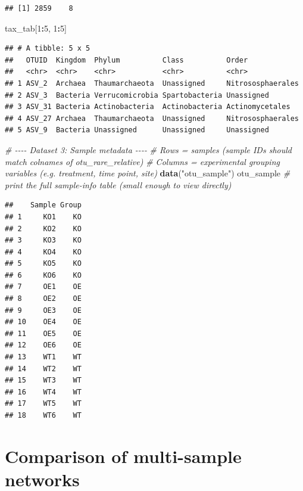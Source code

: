 \documentclass[
]{book}
\newenvironment{Shaded}{\begin{snugshade}}{\end{snugshade}}
\newcommand{\CommentTok}[1]{\textcolor[rgb]{0.56,0.35,0.01}{\textit{#1}}}
\newcommand{\DecValTok}[1]{\textcolor[rgb]{0.00,0.00,0.81}{#1}}
\newcommand{\FunctionTok}[1]{\textcolor[rgb]{0.13,0.29,0.53}{\textbf{#1}}}
\newcommand{\NormalTok}[1]{#1}
\newcommand{\SpecialCharTok}[1]{\textcolor[rgb]{0.81,0.36,0.00}{\textbf{#1}}}
\newcommand{\StringTok}[1]{\textcolor[rgb]{0.31,0.60,0.02}{#1}}
\begin{document}
\begin{verbatim}
## [1] 2859    8
\end{verbatim}

\begin{Shaded}
\begin{Highlighting}[]
\NormalTok{tax\_tab[}\DecValTok{1}\SpecialCharTok{:}\DecValTok{5}\NormalTok{, }\DecValTok{1}\SpecialCharTok{:}\DecValTok{5}\NormalTok{]}
\end{Highlighting}
\end{Shaded}

\begin{verbatim}
## # A tibble: 5 x 5
##   OTUID  Kingdom  Phylum          Class          Order            
##   <chr>  <chr>    <chr>           <chr>          <chr>            
## 1 ASV_2  Archaea  Thaumarchaeota  Unassigned     Nitrososphaerales
## 2 ASV_3  Bacteria Verrucomicrobia Spartobacteria Unassigned       
## 3 ASV_31 Bacteria Actinobacteria  Actinobacteria Actinomycetales  
## 4 ASV_27 Archaea  Thaumarchaeota  Unassigned     Nitrososphaerales
## 5 ASV_9  Bacteria Unassigned      Unassigned     Unassigned
\end{verbatim}

\begin{Shaded}
\begin{Highlighting}[]
\CommentTok{\# {-}{-}{-}{-} Dataset 3: Sample metadata {-}{-}{-}{-}}
\CommentTok{\# Rows = samples (sample IDs should match colnames of \textasciigrave{}otu\_rare\_relative\textasciigrave{})}
\CommentTok{\# Columns = experimental grouping variables (e.g. treatment, time point, site)}
\FunctionTok{data}\NormalTok{(}\StringTok{"otu\_sample"}\NormalTok{)}
\NormalTok{otu\_sample                    }\CommentTok{\# print the full sample{-}info table (small enough to view directly)}
\end{Highlighting}
\end{Shaded}

\begin{verbatim}
##    Sample Group
## 1     KO1    KO
## 2     KO2    KO
## 3     KO3    KO
## 4     KO4    KO
## 5     KO5    KO
## 6     KO6    KO
## 7     OE1    OE
## 8     OE2    OE
## 9     OE3    OE
## 10    OE4    OE
## 11    OE5    OE
## 12    OE6    OE
## 13    WT1    WT
## 14    WT2    WT
## 15    WT3    WT
## 16    WT4    WT
## 17    WT5    WT
## 18    WT6    WT
\end{verbatim}

\section{Comparison of multi-sample networks}\label{comparison-of-multi-sample-networks}
\end{document}
